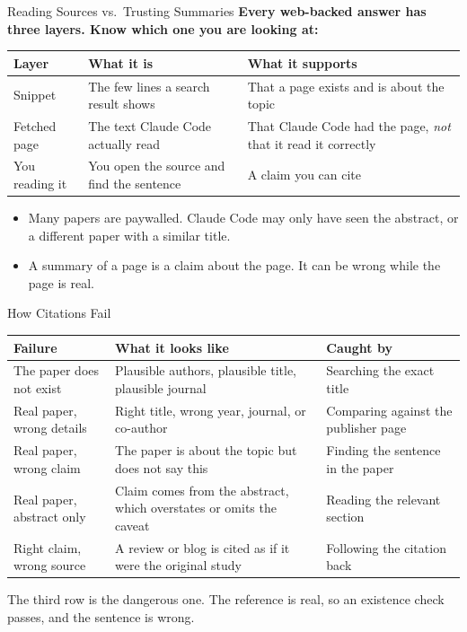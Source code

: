 \documentclass[aspectratio=169, 11pt]{beamer}
\begin{document}
\begin{frame}{Reading Sources vs.\ Trusting Summaries}
  \textbf{Every web-backed answer has three layers. Know which one you are looking at:}

  \vspace{0.6em}
  \begin{tabular}{@{}L{0.22\textwidth}L{0.34\textwidth}L{0.34\textwidth}@{}}
    \toprule
    \textbf{Layer} & \textbf{What it is} & \textbf{What it supports} \\
    \midrule
    Snippet & The few lines a search result shows & That a page exists and is about the topic \\[0.3em]
    Fetched page & The text Claude Code actually read & That Claude Code had the page, \emph{not} that it read it correctly \\[0.3em]
    You reading it & You open the source and find the sentence & A claim you can cite \\
    \bottomrule
  \end{tabular}

  \vspace{0.8em}
  \begin{itemize}\small
    \item Many papers are paywalled. Claude Code may only have seen the abstract, or a different paper with a similar title.
    \item A summary of a page is a claim about the page. It can be wrong while the page is real.
  \end{itemize}
\end{frame}

\begin{frame}{How Citations Fail}
  \small
  \renewcommand{\arraystretch}{1.25}
  \begin{tabular}{@{}L{0.25\textwidth}L{0.4\textwidth}L{0.3\textwidth}@{}}
    \toprule
    \textbf{Failure} & \textbf{What it looks like} & \textbf{Caught by} \\
    \midrule
    The paper does not exist & Plausible authors, plausible title, plausible journal & Searching the exact title \\
    Real paper, wrong details & Right title, wrong year, journal, or co-author & Comparing against the publisher page \\
    Real paper, wrong claim & The paper is about the topic but does not say this & Finding the sentence in the paper \\
    Real paper, abstract only & Claim comes from the abstract, which overstates or omits the caveat & Reading the relevant section \\
    Right claim, wrong source & A review or blog is cited as if it were the original study & Following the citation back \\
    \bottomrule
  \end{tabular}

  \vspace{0.6em}
  \alert{The third row is the dangerous one. The reference is real, so an existence check passes, and the sentence is wrong.}
\end{frame}
\end{document}

